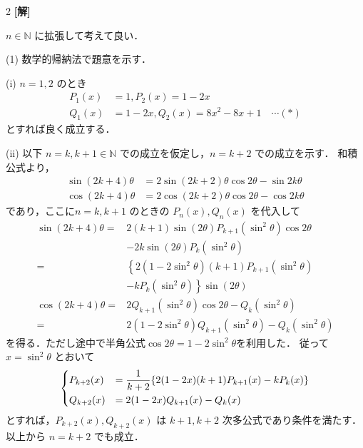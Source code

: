 \documentclass[../../main.tex]{subfiles}
\begin{document}
\setcounter{equation}{0}
\setcounter{figure}{0}
\setcounter{table}{0}
\begin{oframed}
  
\end{oframed}
\setlength{\columnseprule}{0.4pt}
\begin{multicols}{2}
  {\bf[解]}

  $n \in \mathbb{N}$ に拡張して考えて良い．

  (1) 数学的帰納法で題意を示す．

  \vspace{10pt}

  (i)
  $n=1, 2$ のとき
  \begin{align*}
    P_1(x) & = 1, P_2(x) = 1-2x                              \\
    Q_1(x) & = 1-2x, Q_2(x) = 8x^2 - 8x + 1 \quad \cdots (*)
  \end{align*}
  とすれば良く成立する．

  \vspace{10pt}

  (ii)
  以下 $n=k, k+1 \in \mathbb{N}$ での成立を仮定し，$n=k+2$ での成立を示す．
  和積公式より，
  \begin{align*}
    \sin(2k+4)\theta
     & = 2\sin(2k+2)\theta\cos2\theta - \sin2k\theta \\
    \cos(2k+4)\theta
     & = 2\cos(2k+2)\theta\cos2\theta - \cos2k\theta
  \end{align*}
  であり，ここに$n=k, k+1$ のときの $P_n(x), Q_n(x)$ を代入して
  \begin{align*}
    \sin(2k+4)\theta
    = & 2 (k+1) \sin(2\theta) P_{k+1}(\sin^2\theta) \cos 2\theta    \\
      & - 2 k \sin(2\theta) P_k(\sin^2\theta)                       \\
    = & \left\{2(1-2\sin^2\theta)(k+1)P_{k+1}(\sin^2\theta) \right. \\
      & \left. - kP_k(\sin^2\theta)\right\}\sin(2\theta)            \\
    \cos(2k+4)\theta
    = & 2Q_{k+1}(\sin^2\theta)\cos2\theta - Q_{k}(\sin^2\theta)     \\
    = & 2(1-2\sin^2\theta)Q_{k+1}(\sin^2\theta) - Q_k(\sin^2\theta)
  \end{align*}
  を得る．ただし途中で半角公式$\cos2\theta = 1-2\sin^2\theta$を利用した．
  従って$x=\sin^2\theta$ とおいて
  \begin{align}\label{1990-2:eq:condition}
    \begin{dcases}
      P_{k+2}(x) & = \frac{1}{k+2}\{2(1-2x)(k+1)P_{k+1}(x) - kP_k(x)\} \\
      Q_{k+2}(x) & = 2(1-2x)Q_{k+1}(x) - Q_k(x)
    \end{dcases}
  \end{align}
  とすれば，$P_{k+2}(x), Q_{k+2}(x)$ は $k+1, k+2$ 次多公式であり条件を満たす．以上から $n=k+2$ でも成立．


\end{multicols}
\end{document}
